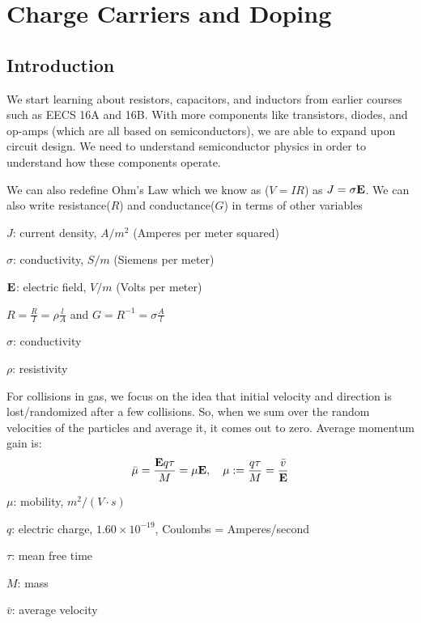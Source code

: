 \chapter{Charge Carriers and Doping}

\section{Introduction}
We start learning about resistors, capacitors, and inductors from earlier courses such as EECS 16A and 16B. With more components like transistors, diodes, and op-amps (which are all based on semiconductors), we are able to expand upon circuit design. We need to understand semiconductor physics in order to understand how these components operate.
\begin{center}
\end{center}

We can also redefine Ohm's Law which we know as ($V = IR$) as $J = \sigma \vb{E}$. We can also write resistance($R$) and conductance($G$) in terms of other variables
\begin{gline}
    \item $J$: current density, $A/m^2$ (Amperes per meter squared)
    \item $\sigma$: conductivity, $S/m$ (Siemens per meter)
    \item $\vb{E}$: electric field, $V/m$ (Volts per meter)
\end{gline}

$R = \frac{R}{I} = \rho \frac{l}{A}$ and $G = R^{-1} = \sigma \frac{A}{l}$
\begin{gline}
    \item $\sigma$: conductivity
    \item $\rho$: resistivity
\end{gline}

For collisions in gas, we focus on the idea that initial velocity and direction is lost/randomized after a few collisions. So, when we sum over the random velocities of the particles and average it, it comes out to zero. Average momentum gain is:
\[\bar{\mu} = \frac{\vb{E} q \tau}{M} = \mu \vb{E}, ~~~ \mu := \frac{q \tau}{M} = \frac{\bar{v}}{\vb{E}}\]
\begin{gline}
    \item $\mu$: mobility, $m^2/ (V \cdot s)$
    \item $q$: electric charge, $1.60 \times 10^{-19}$, Coulombs = Amperes/second
    \item $\tau$: mean free time
    \item $M$: mass
    \item $\bar{v}$: average velocity
\end{gline}

